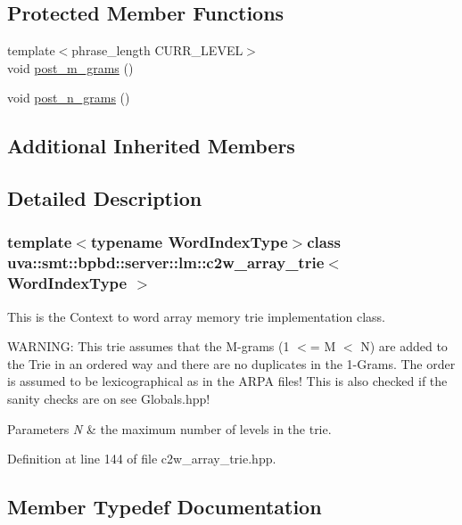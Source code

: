 \subsection*{Protected Member Functions}
\begin{DoxyCompactItemize}
\item 
{\footnotesize template$<$phrase\+\_\+length C\+U\+R\+R\+\_\+\+L\+E\+V\+E\+L$>$ }\\void \hyperlink{classuva_1_1smt_1_1bpbd_1_1server_1_1lm_1_1c2w__array__trie_a510b3630b20daff118835897c0b1b663}{post\+\_\+m\+\_\+grams} ()
\item 
void \hyperlink{classuva_1_1smt_1_1bpbd_1_1server_1_1lm_1_1c2w__array__trie_a0e91aa925a3f84b2444adc9f7d8fe9bb}{post\+\_\+n\+\_\+grams} ()
\end{DoxyCompactItemize}
\subsection*{Additional Inherited Members}


\subsection{Detailed Description}
\subsubsection*{template$<$typename Word\+Index\+Type$>$class uva\+::smt\+::bpbd\+::server\+::lm\+::c2w\+\_\+array\+\_\+trie$<$ Word\+Index\+Type $>$}

This is the Context to word array memory trie implementation class.

W\+A\+R\+N\+I\+N\+G\+: This trie assumes that the M-\/grams (1 $<$= M $<$ N) are added to the Trie in an ordered way and there are no duplicates in the 1-\/\+Grams. The order is assumed to be lexicographical as in the A\+R\+P\+A files! This is also checked if the sanity checks are on see Globals.\+hpp!


\begin{DoxyParams}{Parameters}
{\em N} & the maximum number of levels in the trie. \\
\hline
\end{DoxyParams}


Definition at line 144 of file c2w\+\_\+array\+\_\+trie.\+hpp.



\subsection{Member Typedef Documentation}
\hypertarget{classuva_1_1smt_1_1bpbd_1_1server_1_1lm_1_1c2w__array__trie_a8897c17fb2c7a3bbd1baa91630f886c7}{}
